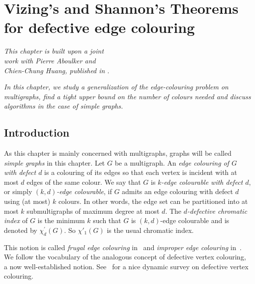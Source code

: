 


\chapter{Vizing's and Shannon's Theorems for defective edge colouring}\label{chpt:defective}

\begin{flushright}{\slshape    
This chapter is built upon a joint \\
work with Pierre Aboulker and \\
Chien-Chung Huang, published in \cite{AAH22}}. \\ \medskip
\end{flushright}

\emph{In this chapter, we study a generalization of the edge-colouring problem on multigraphs, find a tight upper bound on the number of colours needed and discuss algorithms in the case of simple graphs.}

\section{Introduction}
As this chapter is mainly concerned with multigraphs, graphs will be called \emph{simple graphs} in this chapter. 
Let $G$ be a multigraph. 
An \emph{edge colouring of $G$ with defect $d$} is a colouring of its edges so  that each vertex is incident with at most $d$ edges of the same colour. We say that $G$ is \emph{$k$-edge colourable with defect $d$}, or simply \emph{$(k,d)$-edge colourable}, if $G$ admits an edge colouring with defect $d$ using (at most) $k$ colours. In other words, the edge set can be partitioned into at most $k$ submultigraphs of maximum degree at most $d$. 
 The \emph{$d$-defective chromatic index} of $G$ is the minimum $k$ such that $G$ is $(k,d)$-edge colourable and is denoted by $\chi^{'}_{d}(G)$. 
So $\chi'_1(G)$ is the usual chromatic index. 

This notion is called \textit{frugal edge colouring} in~\cite{amini:inria-00144318} and \textit{improper edge colouring} in~\cite{HILTON2001253}. We follow the vocabulary of the analogous concept of defective vertex colouring, a now well-established notion. See~\cite{W18} for a nice dynamic survey on defective vertex colouring. 




